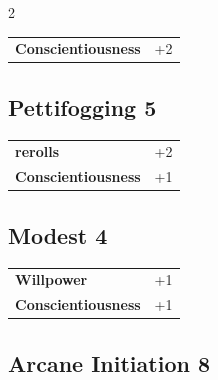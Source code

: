 \begin{multicols}{2}
\begin{tcolorbox}
\begin{tabular}{@{}ll@{}}
    \textbf{Conscientiousness} & +2\\
\end{tabular}


\end{tcolorbox}

\begin{tcolorbox}
    \subsection*{Pettifogging \hfill \small{5 }}
    \tcblower




\begin{tabular}{@{}ll@{}}
    \textbf{rerolls} & +2\\
    \textbf{Conscientiousness} & +1\\
\end{tabular}


\end{tcolorbox}

\begin{tcolorbox}
    \subsection*{Modest \hfill \small{4 }}
    \tcblower




\begin{tabular}{@{}ll@{}}
    \textbf{Willpower} & +1\\
    \textbf{Conscientiousness} & +1\\
\end{tabular}


\end{tcolorbox}

\begin{tcolorbox}
    \subsection*{Arcane Initiation \hfill \small{8 }}
    \tcblower





\end{tcolorbox}
\end{multicols}
